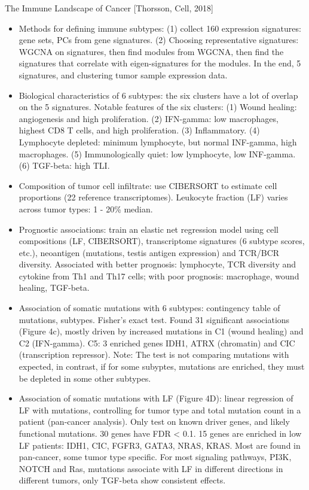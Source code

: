 \documentclass{report}
\begin{document}
The Immune Landscape of Cancer [Thorsson, Cell, 2018]
\begin{itemize}
	
	\item Methods for defining immune subtypes: (1) collect 160 expression signatures: gene sets, PCs from gene signatures. (2) Choosing representative signatures: WGCNA on signatures, then find modules from WGCNA, then find the signatures that correlate with eigen-signatures for the modules. In the end, 5 signatures, and clustering tumor sample expression data. 
	
	\item Biological characteristics of 6 subtypes: the six clusters have a lot of overlap on the 5 signatures. Notable features of the six clusters: (1) Wound healing: angiogenesis and high proliferation. (2) IFN-gamma: low macrophages, highest CD8 T cells, and high proliferation. (3) Inflammatory. (4) Lymphocyte depleted: minimum lymphocyte, but normal INF-gamma, high macrophages. (5) Immunologically quiet: low lymphocyte, low INF-gamma. (6) TGF-beta: high TLI. 
	
	\item Composition of tumor cell infiltrate: use CIBERSORT to estimate cell proportions (22 reference transcriptomes). Leukocyte fraction (LF) varies across tumor types: 1 - 20\% median. 
	
	\item Prognostic associations: train an elastic net regression model using cell compositions (LF, CIBERSORT), transcriptome signatures (6 subtype scores, etc.), neoantigen (mutations, testis antigen expression) and TCR/BCR diversity. Associated with better prognosis: lymphocyte, TCR diversity and cytokine from Th1 and Th17 cells; with poor prognosis: macrophage, wound healing, TGF-beta.  
	
	\item Association of somatic mutations with 6 subtypes: contingency table of mutations, subtypes. Fisher’s exact test. Found 31 significant associations (Figure 4c), mostly driven by increased mutations in C1 (wound healing) and C2 (IFN-gamma). C5: 3 enriched genes IDH1, ATRX (chromatin) and CIC (transcription repressor). Note: The test is not comparing mutations with expected, in contrast, if for some subyptes, mutations are enriched, they must be depleted in some other subtypes.   
	
	\item Association of somatic mutations with LF (Figure 4D): linear regression of LF with mutations, controlling for tumor type and total mutation count in a patient (pan-cancer analysis). Only test on known driver genes, and likely functional mutations. 30 genes have FDR < 0.1. 15 genes  are enriched in low LF patients: IDH1, CIC, FGFR3, GATA3, NRAS, KRAS. Most are found in pan-cancer, some tumor type specific. For most signaling pathways, PI3K, NOTCH and Ras, mutations associate with LF in different directions in different tumors, only TGF-beta show consistent effects. 
	

\end{itemize}
\end{document}
